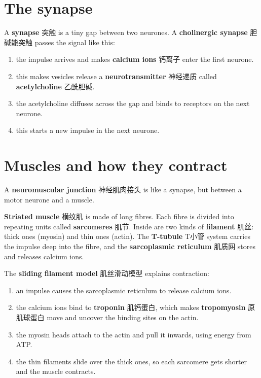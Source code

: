 \documentclass[11pt]{article}
\begin{document}
\section*{The synapse}

A \textbf{synapse} 突触 is a tiny gap between two neurones. A \textbf{cholinergic synapse} 胆碱能突触 passes the signal like this:

\begin{enumerate}
\item the impulse arrives and makes \textbf{calcium ions} 钙离子 enter the first neurone.

\item this makes vesicles release a \textbf{neurotransmitter} 神经递质 called \textbf{acetylcholine} 乙酰胆碱.

\item the acetylcholine diffuses across the gap and binds to receptors on the next neurone.

\item this starts a new impulse in the next neurone.

\end{enumerate}

\section*{Muscles and how they contract}

A \textbf{neuromuscular junction} 神经肌肉接头 is like a synapse, but between a motor neurone and a muscle.

\textbf{Striated muscle} 横纹肌 is made of long fibres. Each fibre is divided into repeating units called \textbf{sarcomeres} 肌节. Inside are two kinds of \textbf{filament} 肌丝: thick ones (myosin) and thin ones (actin). The \textbf{T-tubule} T小管 system carries the impulse deep into the fibre, and the \textbf{sarcoplasmic reticulum} 肌质网 stores and releases calcium ions.

The \textbf{sliding filament model} 肌丝滑动模型 explains contraction:

\begin{enumerate}
\item an impulse causes the sarcoplasmic reticulum to release calcium ions.

\item the calcium ions bind to \textbf{troponin} 肌钙蛋白, which makes \textbf{tropomyosin} 原肌球蛋白 move and uncover the binding sites on the actin.

\item the myosin heads attach to the actin and pull it inwards, using energy from ATP.

\item the thin filaments slide over the thick ones, so each sarcomere gets shorter and the muscle contracts.

\end{enumerate}
\end{document}
